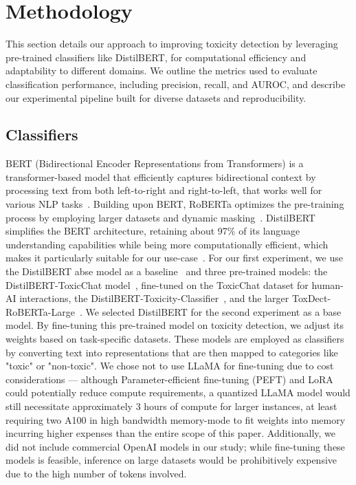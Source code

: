 \section{Methodology}

This section details our approach to improving toxicity detection by leveraging pre-trained classifiers like DistilBERT, for computational efficiency and adaptability to different domains. We outline the metrics used to evaluate classification performance, including precision, recall, and AUROC, and describe our experimental pipeline built for diverse datasets and reproducibility.

\subsection{Classifiers}
BERT (Bidirectional Encoder Representations from Transformers) is a transformer-based model that efficiently captures bidirectional context by processing text from both left-to-right and right-to-left, that works well for various NLP tasks~\cite{devlin2018bert}. Building upon BERT, RoBERTa optimizes the pre-training process by employing larger datasets and dynamic masking~\cite{liu2019roberta}. DistilBERT simplifies the BERT architecture, retaining about 97\% of its language understanding capabilities while being more computationally efficient, which makes it particularly suitable for our use-case~\cite{sanh2019distilbert}.
For our first experiment, we use the DistilBERT abse model as a baseline~\cite{sanh2019distilbert} and three pre-trained models: the DistilBERT-ToxicChat model~\cite{ToxicChat}, fine-tuned on the ToxicChat dataset for human-AI interactions, the DistilBERT-Toxicity-Classifier~\cite{huggingface_toxicity_classifier}, and the larger ToxDect-RoBERTa-Large~\cite{huggingface_toxdect_roberta}.\newline
We selected DistilBERT for the second experiment as a base model. By fine-tuning this pre-trained model on toxicity detection, we adjust its weights based on task-specific datasets. These models are employed as classifiers by converting text into representations that are then mapped to categories like "toxic" or "non-toxic".\newline
We chose not to use LLaMA for fine-tuning due to cost considerations --- although Parameter-efficient fine-tuning (PEFT) and LoRA could potentially reduce compute requirements, a quantized LLaMA model would still necessitate approximately 3 hours of compute for larger instances, at least requiring two A100 in high bandwidth memory-mode to fit weights into memory incurring higher expenses than the entire scope of this paper. Additionally, we did not include commercial OpenAI models in our study; while fine-tuning these models is feasible, inference on large datasets would be prohibitively expensive due to the high number of tokens involved.

